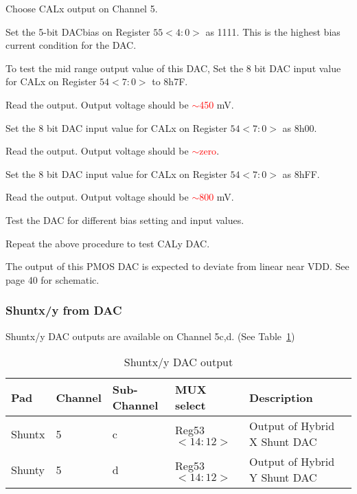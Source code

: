 \documentclass[11pt]{article}   			%
\newcommand\todo[1]{\textcolor{red}{#1}}
\begin{document}
\begin{compactitem}
    \item{Choose CALx output on Channel 5.}
    \item{Set the 5-bit DACbias on Register $55<4:0>$ as 1111. This is the highest bias current condition for the DAC.}
    \item{To test the mid range output value of this DAC, Set the 8 bit DAC input value for CALx on Register $54<7:0>$ to 8h7F}.
    \item{Read the output. Output voltage should be \todo{$\sim$450} mV.}
    \item{Set the 8 bit DAC input value for CALx on Register $54<7:0>$ as 8h00.}
    \item{Read the output. Output voltage should be \todo{$\sim$zero}.}
    \item{Set the 8 bit DAC input value for CALx on Register $54<7:0>$ as 8hFF.}
    \item{Read the output. Output voltage should be \todo{$\sim$800} mV.}
    \item{Test the DAC for different bias setting and input values.}
    \item{Repeat the above procedure to test CALy DAC.}
\end{compactitem}
The output of this PMOS DAC is expected to deviate from linear near VDD. See \cite{amacv2schem} page 40 for schematic.

\subsubsection{Shuntx/y from DAC}
Shuntx/y DAC outputs are available on Channel 5c,d. (See Table~\ref{tab:shuntxy})
\begin{table}[h]
  \begin{center}
\begin{tabular}{|l|l|l|l|l|l|}
\hline
{\bf Pad} & {\bf Channel} & {\bf Sub-Channel} & {\bf MUX select} & {\bf Description}\\
\hline
Shuntx & 5 & c & Reg53$<14:12>$ & Output of Hybrid X Shunt DAC\\
\hline
Shunty & 5 & d & Reg53$<14:12>$ & Output of Hybrid Y Shunt DAC\\
\hline
\end{tabular}
\caption{Shuntx/y DAC output}
\label{tab:shuntxy}
\end{center}
\end{table}
\end{document}
